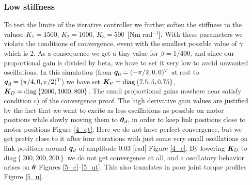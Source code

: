 \subsubsection{Low stiffness}
To test the limits of the iterative controller we further soften the stiffness to the values: $K_1 = 1500$, $K_2 = 1000$, $K_3 = 500$~[Nm rad$^{-1}$]. With these parameters we violate the conditions of convergence, event with the smallest possible value of $\gamma$ which is $2$. As a consequence we get a tiny value for $\beta = 1/400$, and since our proportional gain is divided by beta, we have to set it very low to avoid unwanted oscillations. In this simulation (from ${\boldsymbol{q}}_0=(-\pi/2,0,0)^T$ at rest to ${\boldsymbol{q}}_d=(\pi/4,0,\pi/2)^T$) we have set $\boldsymbol{K}_{\!P} = \mbox{diag}\left\{7.5, 5, 0.75\right\}$, $\boldsymbol{K}_{\!D}=\mbox{diag}\left\{2000,1000,800\right\}$. The small proportional gains nowhere near satisfy condition c) of the convergence proof. 
The high derivative gain values are justified by the fact that we want to excite as less oscillations as possible on motor positions while slowly moving them to $\boldsymbol{\theta}_d$, in order to keep link positions close to motor positions Figure \ref{4_qt}. Here we do not have perfect convergence, but we get pretty close to it after four iterations with just some very small oscillations on link positions around ${\boldsymbol{q}}_d$ of amplitude $0.03$ [rad] Figure \ref{4_e}. By lowering $\boldsymbol{K}_{\!D}$ to $\mbox{diag}\left\{200,200,200\right\}$ we do not get convergence at all, and a oscillatory behavior arises on $\boldsymbol{\theta}$ Figures \ref{5_e}--\ref{5_qt}. This also translates in poor joint torque profiles Figure \ref{5_u}.

